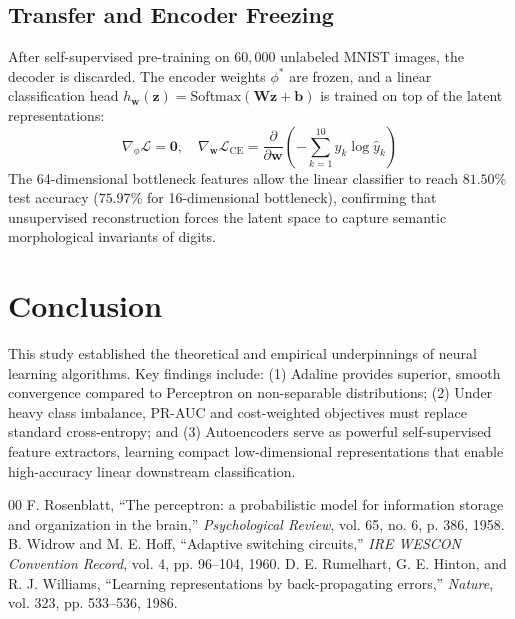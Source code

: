 \documentclass[conference]{IEEEtran}
\begin{document}
\subsection{Transfer and Encoder Freezing}
After self-supervised pre-training on $60,000$ unlabeled MNIST images, the decoder is discarded. The encoder weights $\phi^*$ are frozen, and a linear classification head $h_{\mathbf{w}}(\mathbf{z}) = \text{Softmax}(\mathbf{W} \mathbf{z} + \mathbf{b})$ is trained on top of the latent representations:
\begin{equation}
\nabla_{\phi} \mathcal{L} = \mathbf{0}, \quad \nabla_{\mathbf{w}} \mathcal{L}_{\text{CE}} = \frac{\partial}{\partial \mathbf{w}} \left( -\sum_{k=1}^{10} y_k \log \hat{y}_k \right)
\end{equation}
The 64-dimensional bottleneck features allow the linear classifier to reach $81.50\%$ test accuracy ($75.97\%$ for 16-dimensional bottleneck), confirming that unsupervised reconstruction forces the latent space to capture semantic morphological invariants of digits.

\section{Conclusion}
This study established the theoretical and empirical underpinnings of neural learning algorithms. Key findings include: (1) Adaline provides superior, smooth convergence compared to Perceptron on non-separable distributions; (2) Under heavy class imbalance, PR-AUC and cost-weighted objectives must replace standard cross-entropy; and (3) Autoencoders serve as powerful self-supervised feature extractors, learning compact low-dimensional representations that enable high-accuracy linear downstream classification.


\begin{thebibliography}{00}
 F. Rosenblatt, ``The perceptron: a probabilistic model for information storage and organization in the brain,'' \textit{Psychological Review}, vol. 65, no. 6, p. 386, 1958.
 B. Widrow and M. E. Hoff, ``Adaptive switching circuits,'' \textit{IRE WESCON Convention Record}, vol. 4, pp. 96--104, 1960.
 D. E. Rumelhart, G. E. Hinton, and R. J. Williams, ``Learning representations by back-propagating errors,'' \textit{Nature}, vol. 323, pp. 533--536, 1986.
\end{thebibliography}
\end{document}
